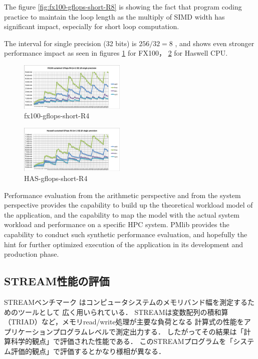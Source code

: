\documentclass[conference]{IEEEtran}
\begin{document}
The figure \ref{fig:fx100-gflops-short-R8} is showing the fact that
program coding practice to maintain the loop length as the multiply of
SIMD width has significant impact, especially for short loop computation.

The interval for single precision (32 bits) is
\begin{math}
256 / 32 = 8
\end{math}
, and shows even stronger performance impact as seen in figures
\ref{fig:fx100-gflops-short-R4} for FX100，
\ref{fig:HAS-gflops-short-R4} for Haswell CPU.

\begin{figure}[bt]
\centering
\includegraphics[width=0.45\textwidth]{figs/fx100-gflops-short-R4.pdf}
\caption{fx100-gflops-short-R4}
\label{fig:fx100-gflops-short-R4}
\end{figure}


\begin{figure}[bt]
\centering
\includegraphics[width=0.45\textwidth]{figs/HAS-gflops-short-R4.pdf}
\caption{HAS-gflops-short-R4}
\label{fig:HAS-gflops-short-R4}
\end{figure}

Performance evaluation from the arithmetic perspective and from the
system perspective provides the capability to build up the theoretical
workload model of the application,
and the capability to map the model with the actual system workload
and performance on a specific HPC system.
PMlib provides the capability to conduct such synthetic performance
evaluation, and hopefully the hint for further optimized execution of
the application in its development and production phase.


\subsection{STREAM性能の評価}
STREAMベンチマーク\cite{stream:1995}
はコンピュータシステムのメモリバンド幅を測定するためのツールとして
広く用いられている．
STREAMは変数配列の積和算（TRIAD）など，メモリread/write処理が主要な負荷となる
計算式の性能をアプリケーションプログラムレベルで測定出力する．
したがってその結果は「計算科学的観点」で評価された性能である．
このSTREAMプログラムを「システム評価的観点」で評価するとかなり様相が異なる．
\end{document}
